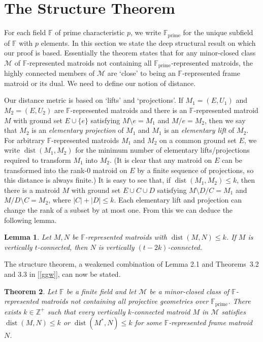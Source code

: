 \documentclass[12pt]{amsart}
\newtheorem{theorem}{Theorem}[section]
\newtheorem{lemma}[theorem]{Lemma}
\theoremstyle{definition}
\newcommand{\bF}{\mathbb F}
\newcommand{\bZ}{\mathbb Z}
\newcommand{\cM}{\mathcal{M}}
\newcommand{\Fprime}{\mathbb{F}_{\mathrm{prime}}}
\DeclareMathOperator{\dist}{dist}
\newcommand{\del}{\!\setminus\!}
\newcommand{\con}{/}
\begin{document}
\section{The Structure Theorem}\label{structuresection}

  For each field $\bF$ of prime characteristic $p$, we write $\Fprime$ for the unique subfield of $\bF$ with $p$ elements. In this section we state the deep structural result on which our proof is based. Essentially the theorem states that for any minor-closed class $\cM$ of $\bF$-represented matroids not containing all $\Fprime$-represented matroids, the highly connected members of $\cM$ are `close' to being an $\bF$-represented frame matroid or its dual. We need to define our notion of distance. 
  
  Our distance metric is based on `lifts' and `projections'. If $M_1 = (E,U_1)$ and $M_2 = (E,U_2)$ are $\bF$-represented matroids and there is an $\bF$-represented matroid $M$ with ground set $E \cup \{e\}$ satisfying $M \del e = M_1$ and $M \con e = M_2$, then we say that $M_2$ is an \emph{elementary projection} of $M_1$ and $M_1$ is an \emph{elementary lift} of $M_2$. For arbitrary $\bF$-represented matroids $M_1$ and $M_2$ on a common ground set $E$, we write $\dist(M_1,M_2)$ for the minimum number of elementary lifts/projections required to transform $M_1$ into $M_2$. (It is clear that any matroid on $E$ can be transformed into the rank-$0$ matroid on $E$ by a finite sequence of projections, so this distance is always finite.) It is easy to see that, if $\dist(M_1,M_2) \le k$, then there is a matroid $M$ with ground set $E \cup C \cup D$ satisfying $M \del D \con C = M_1$ and $M \con D \del C = M_2$, where $|C|+|D| \le k$. Each elementary lift and projection can change the rank of a subset by at most one. From this we can deduce the following lemma.

  \begin{lemma}\label{lem:connectedperturb}
  	Let $M, N$ be $\bF$-represented matroids with $\dist(M,N) \leq k$. If $M$ is vertically $t$-connected, then $N$ is vertically $(t - 2k)$-connected.
  \end{lemma}
  
  The structure theorem, a weakened combination of Lemma 2.1 and Theorems~3.2 and 3.3 in [\ref{ggw}], can now be stated.  
  
  \begin{theorem}\label{big}
    Let $\bF$ be a finite field and let $\cM$ be a minor-closed class of $\bF$-represented matroids not containing all projective geometries over $\Fprime$. There exists $k \in \bZ^+$ such that every vertically $k$-connected matroid $M$ in $\cM$ satisfies $\dist(M,N) \le k$ or $\dist(M^*,N) \le k$ for some $\bF$-represented frame matroid $N$. 
  \end{theorem}
\end{document}
